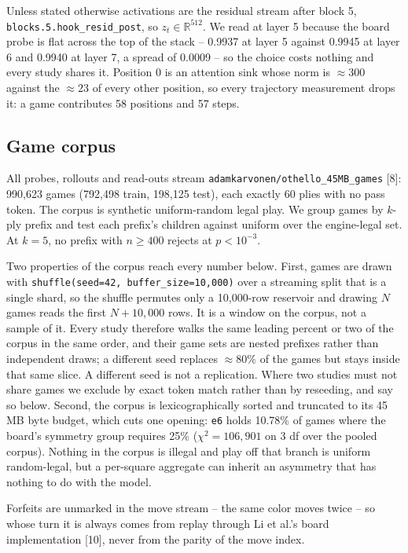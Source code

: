 \documentclass{article}
\begin{document}
Unless stated otherwise activations are the residual stream after block 5,
\texttt{blocks.5.hook\_resid\_post}, so $z_t \in \mathbb{R}^{512}$. We read at layer 5 because the board probe is
flat across the top of the stack -- 0.9937 at layer 5 against 0.9945 at layer 6 and 0.9940 at
layer 7, a spread of 0.0009 -- so the choice costs nothing and every study shares it. Position 0
is an attention sink whose norm is $\approx 300$ against the $\approx 23$ of every other
position, so every trajectory measurement drops it: a game contributes 58
positions and 57 steps.

\subsection{Game corpus}

All probes, rollouts and read-outs stream \texttt{adamkarvonen/othello\_45MB\_games} [8]: 990,623
games (792,498 train, 198,125 test), each exactly 60 plies with no pass token. The corpus is
synthetic uniform-random legal play. We group games by $k$-ply prefix and test each prefix's
children against uniform over the engine-legal set. At $k = 5$, no prefix with $n \ge 400$
rejects at $p < 10^{-3}$.

Two properties of the corpus reach every number below. First, games are drawn with
\texttt{shuffle(seed=42, buffer\_size=10{,}000)} over a streaming split that is a single shard,
so the shuffle permutes only a 10,000-row reservoir and drawing $N$ games reads the first
$N + 10{,}000$ rows. It is a window on the corpus, not a sample of it. Every study therefore walks the same leading percent or two of the
corpus in the same order, and their game sets are nested prefixes rather than independent
draws; a different seed replaces $\approx 80\%$ of the games but stays inside that same slice. A
different seed is not a replication.
Where two studies must not share games we exclude by exact token match rather than by
reseeding, and say so below. Second, the corpus is lexicographically sorted and truncated to
its 45\,MB byte budget, which cuts one opening: \texttt{e6} holds 10.78\% of games where the
board's symmetry group requires 25\% ($\chi^2 = 106{,}901$ on 3 df over the pooled corpus). Nothing in the corpus is
illegal and play off that branch is uniform random-legal, but a per-square aggregate can
inherit an asymmetry that has nothing to do with the model.

Forfeits are unmarked in the move stream -- the same color moves twice -- so whose turn it
is always comes from replay through Li et al.'s board implementation [10], never from the
parity of the move index.
\end{document}
